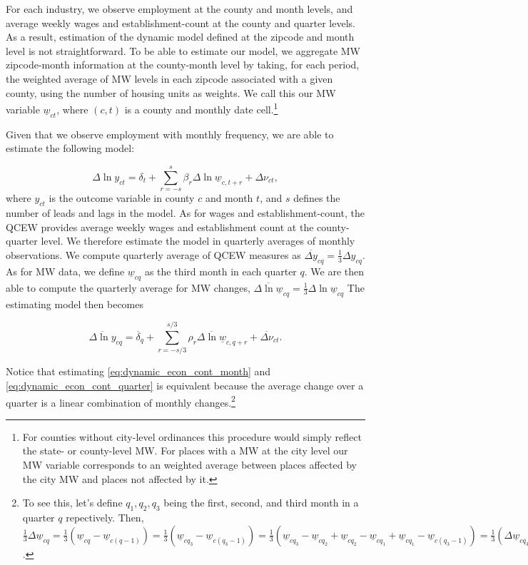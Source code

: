 For each industry, we observe employment at the county and month levels, and average weekly wages 
and establishment-count at the county and quarter levels. As a result, estimation of the dynamic 
model defined at the zipcode and month level is not straightforward. To be able to estimate our 
model, we aggregate MW zipcode-month information at the county-month level by taking, for each 
period, the weighted average of MW levels in each zipcode associated with a given county, using 
the number of housing units as weights. We call this our MW variable $\underline{w}_{ct}$, where 
$(c, t)$ is a county and monthly date cell.\footnote{For counties without city-level ordinances 
	this procedure would simply reflect the state- or county-level MW. For places with a MW at 
	the city level our MW variable corresponds to an weighted average between places affected by 
	the city MW and places not affected by it.}

Given that we observe employment with monthly frequency, we are able to estimate the following 
model:

\begin{equation} \label{eq:dynamic_econ_cont_month}
	\Delta \ln y_{ct} = \delta_{t} 
					+ \sum_{r=-s}^{s} \beta_r \Delta \ln \underline{w}_{c,t+r} 
					+ \Delta \nu_{ct} ,
\end{equation}
where $y_{ct}$ is the outcome variable in county $c$ and month $t$, and $s$ defines the number
of leads and lags in the model. As for wages and establishment-count, the QCEW provides average 
weekly wages and establishment count at the county-quarter level. 
We therefore estimate the model in quarterly averages of monthly observations. 
We compute quarterly 
average of QCEW measures as $\overline{\Delta y}_{cq} = \frac{1}{3} \Delta y_{cq}$. As for MW data, we define 
$\underline{w}_{cq}$ as the third month in each quarter $q$. We are then able to compute the 
quarterly average for MW changes, $\overline{\Delta \ln \underline{w}}_{cq}=  \frac{1}{3} \Delta \ln \underline{w}_{cq}$
The estimating model then becomes

\begin{equation} \label{eq:dynamic_econ_cont_quarter}
	\overline{\Delta \ln y}_{cq} = \overline{\delta}_q 
				+ \sum_{r=-s/3}^{s/3} \rho_r \overline{\Delta \ln \underline{w}}_{c,q+r}
				+ \overline{\Delta \nu}_{ct}.
\end{equation}

Notice that estimating \autoref{eq:dynamic_econ_cont_month} 
and \autoref{eq:dynamic_econ_cont_quarter} is equivalent because the average change 
over a quarter is a linear combination of monthly changes.\footnote{To see this, let's 
	define $q_1, q_2, q_3$ being the first, second, and third month in a quarter $q$ repectively. 
Then, $\frac{1}{3}\Delta \underline{w}_{cq} = 
		     \frac{1}{3} \left( \underline{w}_{cq} - \underline{w}_{c(q-1)} \right) = 
             \frac{1}{3} \left( \underline{w}_{cq_3} - \underline{w}_{c(q_3-1)} \right) = 
             \frac{1}{3} \left( \underline{w}_{cq_3} - \underline{w}_{cq_2}  + \underline{w}_{cq_2} - \underline{w}_{cq_1}  + \underline{w}_{cq_1} - \underline{w}_{c(q_3-1)} \right) = 
             \frac{1}{3} \left( \Delta \underline{w}_{cq_3} + \Delta \underline{w}_{cq_2}  + \Delta \underline{w}_{cq_1} \right)$.}

